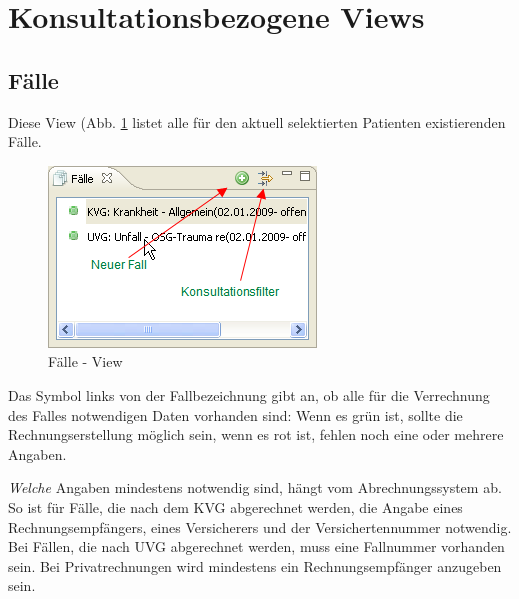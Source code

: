 

\section{Konsultationsbezogene Views}

\subsection{Fälle}
Diese View (Abb. \ref{fig:faelle2} listet alle für den aktuell selektierten
Patienten existierenden Fälle. 
\begin{figure}
  \includegraphics{images/faelleview}
  \caption{Fälle - View}
  \label{fig:faelle2}
\end{figure}

Das Symbol links von der Fallbezeichnung gibt an, ob alle für die Verrechnung
des Falles notwendigen Daten vorhanden sind: Wenn es grün ist, sollte die
Rechnungserstellung möglich sein, wenn es rot ist, fehlen noch eine oder mehrere
Angaben.

\textit{Welche} Angaben mindestens notwendig sind, hängt vom Abrechnungssystem ab. So ist für Fälle, die nach dem KVG abgerechnet werden, die Angabe
eines Rechnungsempfängers, eines Versicherers und der Versichertennummer
notwendig. Bei Fällen, die nach UVG abgerechnet werden, muss eine Fallnummer
vorhanden sein. Bei Privatrechnungen wird mindestens ein Rechnungsempfänger anzugeben sein.

